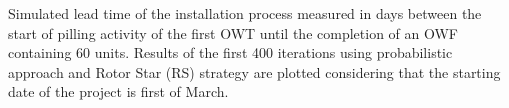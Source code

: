 \label{fig:iterations}
Simulated lead time of the installation process measured in days between the start of pilling activity of the first OWT until the completion of an OWF containing 60 units. Results of the first 400 iterations using probabilistic approach and Rotor Star (RS) strategy are plotted considering that the starting date of the project is first of March.